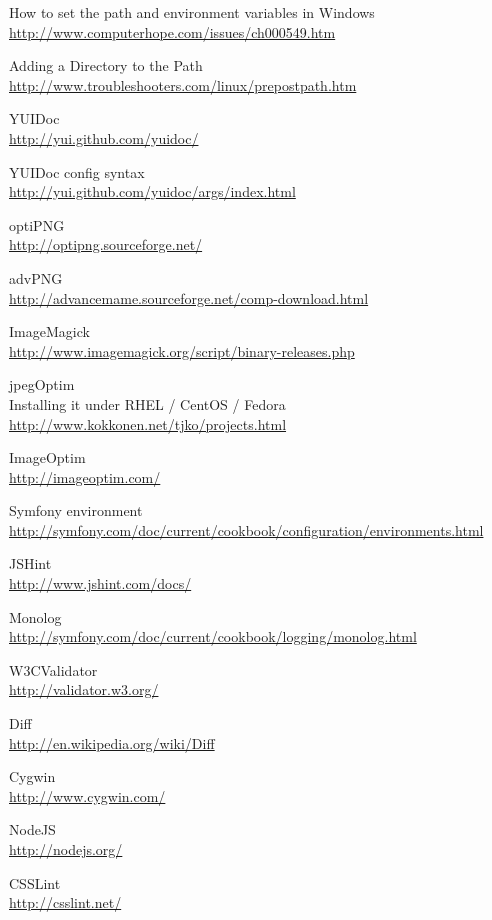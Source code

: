 \begin{thebibliography}{9}

 How to set the path and environment variables in Windows \\
\url{http://www.computerhope.com/issues/ch000549.htm}

 Adding a Directory to the Path \\
\url{http://www.troubleshooters.com/linux/prepostpath.htm}

 YUIDoc \\
\url{http://yui.github.com/yuidoc/}

 YUIDoc config syntax \\
\url{http://yui.github.com/yuidoc/args/index.html}

 optiPNG \\
\url{http://optipng.sourceforge.net/}

 advPNG \\
\url{http://advancemame.sourceforge.net/comp-download.html}

 ImageMagick \\
\url{http://www.imagemagick.org/script/binary-releases.php}

 jpegOptim \\
Installing it under RHEL / CentOS / Fedora \\
\url{http://www.kokkonen.net/tjko/projects.html}

 ImageOptim \\
\url{http://imageoptim.com/}

 Symfony environment \\
\url{http://symfony.com/doc/current/cookbook/configuration/environments.html}

 JSHint \\
\url{http://www.jshint.com/docs/}

 Monolog \\
\url{http://symfony.com/doc/current/cookbook/logging/monolog.html}

 W3CValidator \\
\url{http://validator.w3.org/}

 Diff \\
\url{http://en.wikipedia.org/wiki/Diff}

 Cygwin \\
\url{http://www.cygwin.com/}

 NodeJS \\
\url{http://nodejs.org/}

 CSSLint \\
\url{http://csslint.net/}

\end{thebibliography}